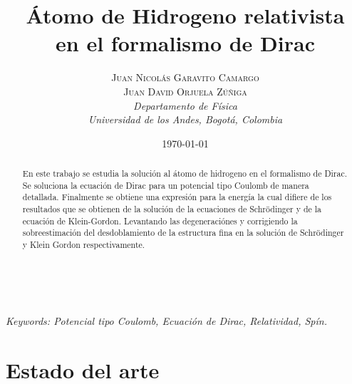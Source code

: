 \documentclass[a4paper, 12pt]{article} %
\title{\textbf{\'Atomo de Hidrogeno relativista}\\ %
 en el formalismo de Dirac} %
\author{\textsc{Juan Nicol\'as Garavito Camargo \\ Juan David Orjuela Z\'u\~niga} %
\\{\textit{Departamento de F\'isica\\}
\textit{Universidad de los Andes, Bogot\'a, Colombia}}} %
\date{\today} %
\makeatletter
\renewcommand{\maketitle}{ %
\begin{flushright} %
{\LARGE\@title} %

\vspace{50pt} %

{\large\@author} %
\\\@date %

\vspace{40pt} %
\end{flushright}
}
\makeatother
\begin{document}
\maketitle %



\begin{abstract}
En este trabajo se estudia la soluci\'on al \'atomo de hidrogeno en el formalismo de Dirac.
Se soluciona la ecuaci\'on de Dirac para un potencial tipo Coulomb de manera detallada. 
Finalmente se obtiene una expresi\'on para la energ\'ia la cual difiere de los resultados
que se obtienen de la soluci\'on de la ecuaciones de Schr\"odinger y de la ecuaci\'on de 
Klein-Gordon. Levantando las degeneraci\'ones  y corrigiendo la  sobreestimaci\'on 
del desdoblamiento de la estructura fina en la soluci\'on de Schr\"odinger y Klein 
Gordon respectivamente.
\end{abstract}
\hspace*{3,6mm}\textit{Keywords: Potencial tipo Coulomb, Ecuaci\'on de Dirac, Relatividad, Sp\'in. }  %

\vspace{30pt} %


\section{Estado del arte}
\end{document}
